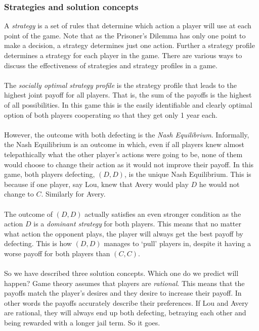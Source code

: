 \subsubsection{Strategies and solution concepts}
A \textit{strategy} is a set of rules that determine which action a player will use at each point of the game. Note that as the Prisoner's Dilemma has only one point to make a decision, a strategy determines just one action. Further a strategy profile determines a strategy for each player in the game. There are various ways to discuss the effectiveness of strategies and strategy profiles in a game.\\
\\
The \textit{socially optimal strategy profile} is the strategy profile that leads to the highest joint payoff for all players. That is, the sum of the payoffs is the highest of all possibilities. In this game this is the easily identifiable and clearly optimal option of both players cooperating so that they get only 1 year each.\\
\\
However, the outcome with both defecting is the \textit{Nash Equilibrium}. Informally, the Nash Equilibrium is an outcome in which, even if all players knew almost telepathically what the other player's actions were going to be, none of them would choose to change their action as it would not improve their payoff. In this game, both players defecting, $(D,D)$, is the unique Nash Equilibrium. This is because if one player, say Lou, knew that Avery would play $D$ he would not change to $C$. Similarly for Avery.\\
\\
The outcome of $(D, D)$ actually satisfies an even stronger condition as the action $D$ is a \textit{dominant strategy} for both players. This means that no matter what action the opponent plays, the player will always get the best payoff by defecting. This is how $(D,D)$ manages to `pull' players in, despite it having a worse payoff for both players than $(C,C)$.\\
\\
So we have described three solution concepts. Which one do we predict will happen? Game theory assumes that players are \textit{rational}. This means that the payoffs match the player's desires and they desire to increase their payoff. In other words the payoffs accurately describe their preferences. If Lou and Avery are rational, they will always end up both defecting, betraying each other and being rewarded with a longer jail term. So it goes.
